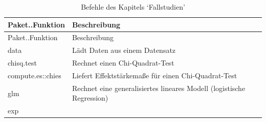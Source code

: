 \documentclass[12pt,ngerman,]{book}
\theoremstyle{definition}
\theoremstyle{definition}
\theoremstyle{remark}
\begin{document}
\begin{longtable}[]{@{}ll@{}}
\caption{Befehle des Kapitels `Fallstudien'}\tabularnewline
\toprule
\begin{minipage}[b]{0.31\columnwidth}\raggedright\strut
Paket..Funktion\strut
\end{minipage} & \begin{minipage}[b]{0.42\columnwidth}\raggedright\strut
Beschreibung\strut
\end{minipage}\tabularnewline
\midrule
\endfirsthead
\toprule
\begin{minipage}[b]{0.31\columnwidth}\raggedright\strut
Paket..Funktion\strut
\end{minipage} & \begin{minipage}[b]{0.42\columnwidth}\raggedright\strut
Beschreibung\strut
\end{minipage}\tabularnewline
\midrule
\endhead
\begin{minipage}[t]{0.31\columnwidth}\raggedright\strut
data\strut
\end{minipage} & \begin{minipage}[t]{0.42\columnwidth}\raggedright\strut
Lädt Daten aus einem Datensatz\strut
\end{minipage}\tabularnewline
\begin{minipage}[t]{0.31\columnwidth}\raggedright\strut
chisq.test\strut
\end{minipage} & \begin{minipage}[t]{0.42\columnwidth}\raggedright\strut
Rechnet einen Chi-Quadrat-Test\strut
\end{minipage}\tabularnewline
\begin{minipage}[t]{0.31\columnwidth}\raggedright\strut
compute.es::chies\strut
\end{minipage} & \begin{minipage}[t]{0.42\columnwidth}\raggedright\strut
Liefert Effektstärkemaße für einen Chi-Quadrat-Test\strut
\end{minipage}\tabularnewline
\begin{minipage}[t]{0.31\columnwidth}\raggedright\strut
glm\strut
\end{minipage} & \begin{minipage}[t]{0.42\columnwidth}\raggedright\strut
Rechnet eine generalisiertes lineares Modell (logistische
Regression)\strut
\end{minipage}\tabularnewline
\begin{minipage}[t]{0.31\columnwidth}\raggedright\strut
exp\strut
\end{minipage} & \begin{minipage}[t]{0.42\columnwidth}\raggedright\strut

\end{minipage}
\end{longtable}
\end{document}
